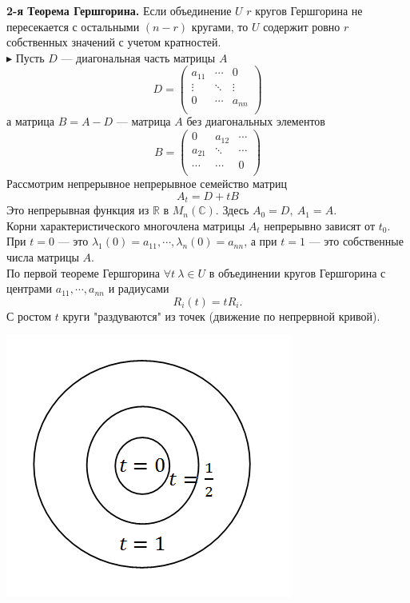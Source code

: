 \documentclass[12pt]{article}
\theoremstyle{definition}
\numberwithin{equation}{section}
\begin{document}
\textbf{2-я Теорема Гершгорина.} Если объединение $U$ $r$ кругов Гершгорина не пересекается с остальными $(n-r)$ кругами, то $U$ содержит ровно $r$ собственных значений с учетом кратностей.\\
$\blacktriangleright$ Пусть $D$ --- диагональная часть матрицы $A$
\[D=\begin{pmatrix}
a_{11} & \cdots & 0 \\
\vdots & \ddots & \vdots \\
0 & \cdots & a_{nn} \\
\end{pmatrix}\]
а матрица $B=A-D$ --- матрица $A$ без диагональных элементов 
\[B=\begin{pmatrix}
0 & a_{12} & \cdots \\
a_{21} & \ddots & \cdots \\
\cdots & \cdots & 0 \\
\end{pmatrix}\]
Рассмотрим непрерывное непрерывное семейство матриц $$A_t=D+tB$$
Это непрерывная функция из $\mathbb{R}$ в $M_n(\mathbb{C})$. Здесь $A_0=D,~A_1=A$.\\
Корни характеристического многочлена матрицы $A_t$ непрерывно зависят от $t_0$. При $t=0$ --- это $\lambda_1(0)=a_{11},\cdots,\lambda_n(0)=a_{nn}$, а при $t=1$ --- это собственные числа матрицы $A$.\\
По первой теореме Гершгорина $\forall t~\lambda\in U$ в объединении кругов Гершгорина с центрами $a_{11},\cdots,a_{nn}$ и радиусами $$R_i(t)=tR_i.$$
С ростом $t$ круги "раздуваются" из точек (движение по непрервной кривой).
\begin{center}
\includegraphics[scale=0.8]{l9_4.png}
\end{center}
\end{document}
